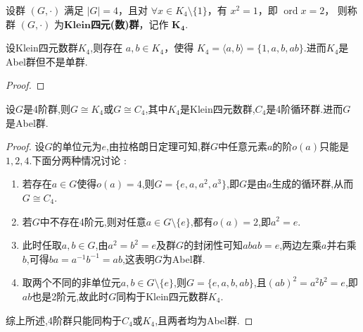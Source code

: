 \documentclass[../../main.tex]{subfiles}%
\begin{document}
\begin{definition}[Klein四元数群]
设群 $(G,\cdot)$ 满足 $|G|=4$，且对 $\forall x\in K_4\setminus\{1\}$，有 $x^2=1$，即 $\operatorname{ord}x=2$，
则称群 $(G,\cdot)$ 为$\mathbf{Klein}$\textbf{四元(数)群}，记作 $\bm{K_4}$.
\end{definition}

\begin{theorem}\label{theorem:Klein四元数群的基本性质}
设Klein四元数群$K_4$,则存在 $a,b\in K_4$，使得 $K_4=\langle a,b\rangle=\{1,a,b,ab\}$.进而$K_4$是Abel群但不是单群.
\end{theorem}
\begin{proof}
    
\end{proof}

\begin{proposition}\label{proposition:4阶群只有两个4阶循环群和Klein四元群}
设$G$是4阶群,则$G\cong K_4$或$G\cong C_4$,其中$K_4$是Klein四元数群,$C_4$是4阶循环群.进而$G$是Abel群.
\end{proposition}
\begin{proof}
设$G$的单位元为$e$,由拉格朗日定理可知,群$G$中任意元素$a$的阶$o(a)$只能是$1,2,4$.下面分两种情况讨论 :
\begin{enumerate}[(1)]
\item 若存在$a\in G$使得$o(a)=4$,则$G=\{e,a,a^2,a^3\}$,即$G$是由$a$生成的循环群,从而$G\cong C_4$.
\item 若$G$中不存在4阶元,则对任意$a\in G\setminus\{e\}$,都有$o(a)=2$,即$a^2=e$.
\item 此时任取$a,b\in G$,由$a^2=b^2=e$及群$G$的封闭性可知$abab=e$,两边左乘$a$并右乘$b$,可得$ba=a^{-1}b^{-1}=ab$,这表明$G$为Abel群.
\item 取两个不同的非单位元$a,b\in G\setminus\{e\}$,则$G=\{e,a,b,ab\}$,且$(ab)^2=a^2b^2=e$,即$ab$也是2阶元,故此时$G$同构于Klein四元数群$K_4$.
\end{enumerate}
综上所述,4阶群只能同构于$C_4$或$K_4$,且两者均为Abel群.
\end{proof}
\end{document}
